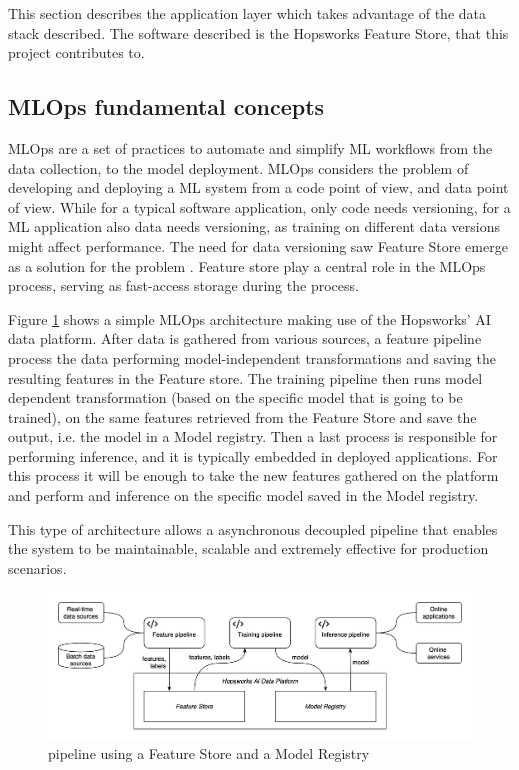 This section describes the application layer which takes advantage of the data stack described. The software described is the Hopsworks Feature Store, that this project contributes to.

\subsection{MLOps fundamental concepts}

\gls{MLOps} are a set of practices to automate and simplify \gls{ML} workflows from the data collection, to the model deployment. \gls{MLOps} considers the problem of developing and deploying a \gls{ML} system from a code point of view, and data point of view. While for a typical software application, only code needs versioning, for a \gls{ML} application also data needs versioning, as training on different data versions might affect performance. The need for data versioning saw Feature Store emerge as a solution for the problem \cite{MeetMichelangeloUbers2017}. Feature store play a central role in the \gls{MLOps} process, serving as fast-access storage during the process.

Figure \ref{fig:mlops} shows a simple \gls{MLOps} architecture making use of the Hopsworks' AI data platform. After data is gathered from various sources, a feature pipeline process the data performing model-independent transformations and saving the resulting features in the Feature store. The training pipeline then runs model dependent transformation (based on the specific model that is going to be trained), on the same features retrieved from the Feature Store and save the output, i.e. the model in a Model registry. Then a last process is responsible for performing inference, and it is typically embedded in deployed applications. For this process it will be enough to take the new features gathered on the platform and perform and inference on the specific model saved in the Model registry.

This type of architecture allows a asynchronous decoupled pipeline that enables the system to be maintainable, scalable and extremely effective for production scenarios.

\begin{figure}[!ht]
    \begin{center}
      \includegraphics[width=\textwidth]{figures/2-background/MLOps.png}
    \end{center}
    \caption{ pipeline using a Feature Store and a Model Registry}
    \label{fig:mlops}
\end{figure}



